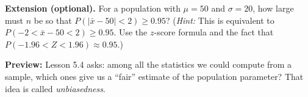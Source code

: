\documentclass[10pt]{article}
\begin{document}
\begin{extensionbox}
\textbf{Extension (optional).}
For a population with $\mu = 50$ and $\sigma = 20$, how large must $n$ be so that
$P(|\bar{x} - 50| < 2) \ge 0.95$? (\textit{Hint:} This is equivalent to $P(-2 < \bar{x} - 50 < 2) \ge 0.95$.
Use the $z$-score formula and the fact that $P(-1.96 < Z < 1.96) \approx 0.95$.)
\end{extensionbox}

\begin{reflectionbox}
\textbf{Preview:} Lesson 5.4 asks: among all the statistics we could compute from a sample, which ones give us a ``fair'' estimate of the population parameter? That idea is called \emph{unbiasedness}.
\end{reflectionbox}
\end{document}
